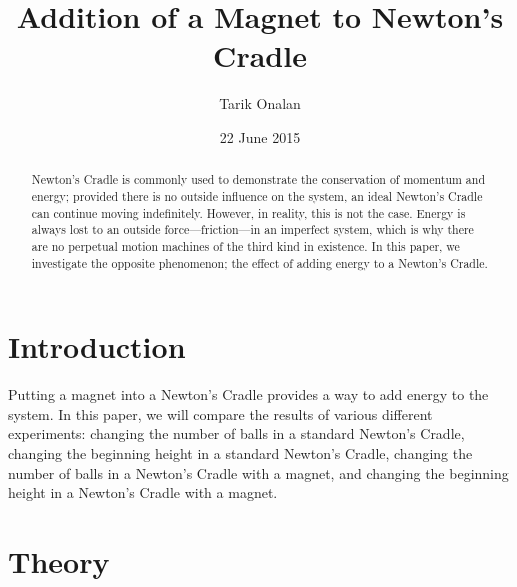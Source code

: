 \documentclass[aip,jmp,amsmath,amssymb,reprint,author-numerical]{revtex4-1}
\begin{document}
    \title[Addition of a Magnet to Newton's Cradle]{Addition of a Magnet to Newton's Cradle}

    \author{Tarik Onalan}

    \date{22 June 2015}

    \begin{abstract}
        Newton's Cradle is commonly used to demonstrate the conservation of momentum and energy;
        provided there is no outside influence on the system, an ideal Newton's Cradle can continue
        moving indefinitely. However, in reality, this is not the case. Energy is always lost to an
        outside force---friction---in an imperfect system, which is why there are no perpetual motion
        machines of the third kind in existence. In this paper, we investigate the opposite phenomenon;
        the effect of adding energy to a Newton's Cradle.
    \end{abstract}


    \maketitle


    \section{\label{sec:intro}Introduction}

        Putting a magnet into a Newton's Cradle provides a way to add energy to the system. In this
        paper, we will compare the results of various different experiments: changing the number of
        balls in a standard Newton's Cradle, changing the beginning height in a standard Newton's
        Cradle, changing the number of balls in a Newton's Cradle with a magnet, and changing the
        beginning height in a Newton's Cradle with a magnet.


    \section{\label{sec:theory}Theory}
\end{document}

